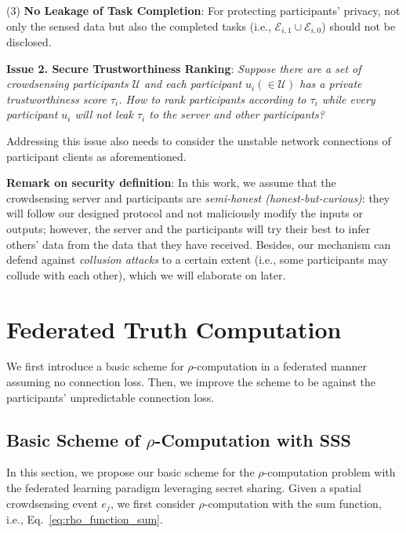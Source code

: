 (3) \textbf{No Leakage of Task Completion}: For protecting participants' privacy, not only the sensed data but also the completed tasks (i.e., $\mathcal E_{i,1} \cup \mathcal E_{i,0}$) should not be disclosed.

\vspace{+.5em}
\noindent \textbf{Issue 2. Secure Trustworthiness Ranking}: \textit{Suppose there are a set of crowdsensing participants $\mathcal U$ and each participant $u_i (\in \mathcal U)$ has a private trustworthiness score $\tau_i$. How to rank participants according to $\tau_i$ while every participant $u_i$ will not leak $\tau_i$ to the server and other participants?}

Addressing this issue also needs to consider the unstable network connections of participant clients as aforementioned.


\textbf{Remark on security definition}: In this work, we assume that the crowdsensing server and participants are \textit{semi-honest (honest-but-curious)}: they will follow our designed protocol and not maliciously modify the inputs or outputs; however, the server and the participants will try their best to infer others' data from the data that they have received. Besides, our mechanism can defend against \textit{collusion attacks} to a certain extent (i.e., some participants may collude with each other), which we will elaborate on later.

\section{Federated Truth Computation}
\label{sec:truth_computation}

We first introduce a basic scheme for $\rho$-computation in a federated manner assuming no connection loss. Then, we improve the scheme to be against the participants' unpredictable connection loss. %

\subsection{Basic Scheme of $\rho$-Computation with SSS}
\label{sub:basic_rho_computation}

In this section, we propose our basic scheme for the $\rho$-computation problem with the federated learning paradigm leveraging secret sharing. Given a spatial crowdsensing event $e_j$, we first consider $\rho$-computation with the sum function, i.e., Eq.~\ref{eq:rho_function_sum}.

